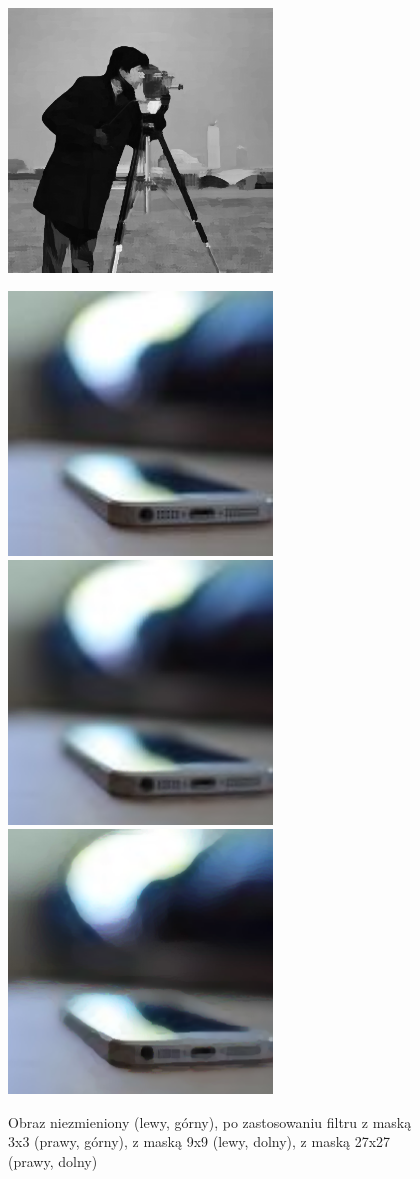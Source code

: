 \documentclass[a4paper,12pt]{book}
\begin{document}
\begin{figure}[H]
				\includegraphics[width=7cm, height=7cm]{man-filter-kuwahara27x27.png}
			\end{figure}
		\begin{figure}[H]
			\caption{Obraz niezmieniony (lewy, górny), po zastosowaniu filtru z maską 3x3 (prawy, górny), z maską 9x9 (lewy, dolny), z maską 27x27 (prawy, dolny)}
			\includegraphics[width=7cm, height=7cm]{phone-unmodified.jpg}
			\includegraphics[width=7cm, height=7cm]{phone-filter-kuwahara-color3x3.png}
			\includegraphics[width=7cm, height=7cm]{phone-filter-kuwahara-color9x9.png}

\end{figure}
\end{document}

